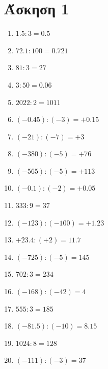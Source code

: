\documentclass[a4paper,10pt]{report}
\begin{document}
\section*{Άσκηση 1  \hfill \small{}}
\begin{enumerate}[1)]
 \item $1.5:3=0.5$
 \item $72.1:100=0.721$
 \item $81:3=27$
 \item $3:50=0.06$
 \item $2022:2=1011$
 \item $(-0.45):(-3)=+0.15$
 \item $(-21):(-7)=+3$
 \item $(-380):(-5)=+76$
 \item $(-565):(-5)=+113$
 \item $(-0.1):(-2)=+0.05$
 \item $333:9=37$
 \item $(-123):(-100)=+1.23$
 \item $+23.4:(+2)=11.7$
 \item $(-725):(-5)=145$
 \item $702:3=234$
 \item $(-168):(-42)=4$
 \item $555:3=185$
 \item $(-81.5):(-10)=8.15$
 \item $1024:8=128$
 \item $(-111):(-3)=37$
\end{enumerate}
\end{document}

